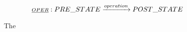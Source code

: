 \begin{figure}[H]
\begin{gather*}
\underline{\scriptstyle{OPER}}: PRE\_STATE \xrightarrow{operation} POST\_STATE
\end{gather*}
\caption{The }
\label{fig_oz_transition_rules}
\end{figure}

